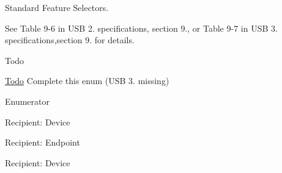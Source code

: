 Standard Feature Selectors. 

See Table 9-\/6 in U\-S\-B 2. specifications, section 9., or Table 9-\/7 in U\-S\-B 3. specifications,section 9. for details.

\begin{DoxyRefDesc}{Todo}
\item[\hyperlink{todo__todo000039}{Todo}]Complete this enum (U\-S\-B 3. missing) \end{DoxyRefDesc}
\begin{Desc}
\item[Enumerator]\par
\begin{description}
\item[{\em 
\hypertarget{classmdt_usb_control_transfer_acae7a9c10825dd7fa7695a16986a2f36aca848daa4edec831a1104579c4090324}{D\-E\-V\-I\-C\-E\-\_\-\-R\-E\-M\-O\-T\-E\-\_\-\-W\-A\-K\-E\-U\-P}\label{classmdt_usb_control_transfer_acae7a9c10825dd7fa7695a16986a2f36aca848daa4edec831a1104579c4090324}
}]Recipient\-: Device \item[{\em 
\hypertarget{classmdt_usb_control_transfer_acae7a9c10825dd7fa7695a16986a2f36a87146aadc04de87777e6158e4488f5aa}{E\-N\-D\-P\-O\-I\-N\-T\-\_\-\-H\-A\-L\-T}\label{classmdt_usb_control_transfer_acae7a9c10825dd7fa7695a16986a2f36a87146aadc04de87777e6158e4488f5aa}
}]Recipient\-: Endpoint \item[{\em 
\hypertarget{classmdt_usb_control_transfer_acae7a9c10825dd7fa7695a16986a2f36a149a70859728a79c49046a6f40087a4f}{T\-E\-S\-T\-\_\-\-M\-O\-D\-E}\label{classmdt_usb_control_transfer_acae7a9c10825dd7fa7695a16986a2f36a149a70859728a79c49046a6f40087a4f}
}]Recipient\-: Device \end{description}
\end{Desc}


